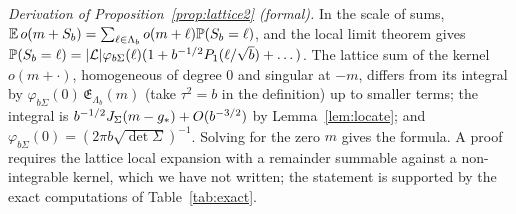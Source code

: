 \noindent\emph{Derivation of Proposition~\ref{prop:lattice2} (formal).} In the scale of sums,
$\mathbb{E}\,o(m+S_b)=\sum_{\ell\in\Lambda_b}o(m+\ell)\mathbb{P}(S_b=\ell)$, and the local limit theorem gives
$\mathbb{P}(S_b=\ell)=|\mathcal{L}|\varphi_{b\Sigma}(\ell)(1+b^{-1/2}P_1(\ell/\sqrt b)+\dots)$. The lattice sum of the kernel
$o(m+\cdot)$, homogeneous of degree $0$ and singular at $-m$, differs from its integral by
$\varphi_{b\Sigma}(0)\,\mathfrak E_{\Lambda_b}(m)$ (take $\tau^2=b$ in the definition) up to smaller terms; the integral is
$b^{-1/2}J_\Sigma(m-g_\ast)+O(b^{-3/2})$ by Lemma~\ref{lem:locate}; and $\varphi_{b\Sigma}(0)=(2\pi b\sqrt{\det\Sigma})^{-1}$.
Solving for the zero $m$ gives the formula. A proof requires the lattice local expansion with a remainder summable
against a non-integrable kernel, which we have not written; the statement is supported by the exact computations of
Table~\ref{tab:exact}.
